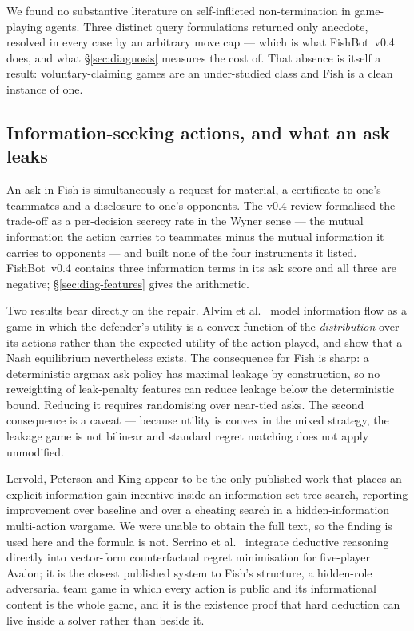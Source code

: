 \documentclass[11pt]{article}
\theoremstyle{definition}
\DeclareRobustCommand{\vfour}{\texorpdfstring{\mbox{FishBot v0.4}}{FishBot v0.4}}
\begin{document}
We found no substantive literature on self-inflicted non-termination in
game-playing agents. Three distinct query formulations returned only anecdote,
resolved in every case by an arbitrary move cap --- which is what \vfour{} does,
and what \S\ref{sec:diagnosis} measures the cost of. That absence is itself a
result: voluntary-claiming games are an under-studied class and Fish is a clean
instance of one.

\subsection{Information-seeking actions, and what an ask leaks}
\label{sec:related-info}

An ask in Fish is simultaneously a request for material, a certificate to one's
teammates and a disclosure to one's opponents. The v0.4 review formalised the
trade-off as a per-decision secrecy rate in the Wyner \cite{wyner} sense --- the
mutual information the action carries to teammates minus the mutual information
it carries to opponents --- and built none of the four instruments it listed.
\vfour{} contains three information terms in its ask score and all three are
negative; \S\ref{sec:diag-features} gives the arithmetic.

Two results bear directly on the repair. Alvim et al.\ \cite{alvim-leakage} model
information flow as a game in which the defender's utility is a convex function
of the \emph{distribution} over its actions rather than the expected utility of
the action played, and show that a Nash equilibrium nevertheless exists. The
consequence for Fish is sharp: a deterministic argmax ask policy has maximal
leakage by construction, so no reweighting of leak-penalty features can reduce
leakage below the deterministic bound. Reducing it requires randomising over
near-tied asks. The second consequence is a caveat --- because utility is convex
in the mixed strategy, the leakage game is not bilinear and standard regret
matching does not apply unmodified.

Lervold, Peterson and King \cite{lervold-infogain} appear to be the only
published work that places an explicit information-gain incentive inside an
information-set tree search, reporting improvement over baseline and over a
cheating search in a hidden-information multi-action wargame. We were unable to
obtain the full text, so the finding is used here and the formula is not.
Serrino et al.\ \cite{serrino-deeprole} integrate deductive reasoning directly
into vector-form counterfactual regret minimisation for five-player Avalon; it is
the closest published system to Fish's structure, a hidden-role adversarial team
game in which every action is public and its informational content is the whole
game, and it is the existence proof that hard deduction can live inside a solver
rather than beside it.
\end{document}
